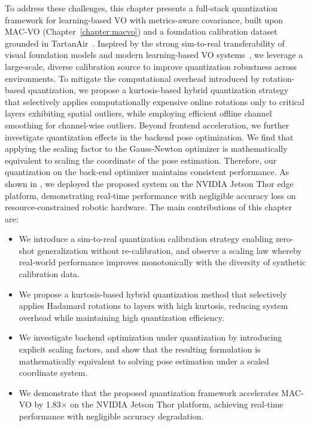 To address these challenges, this chapter presents a full-stack quantization framework for learning-based VO with metrics-aware covariance, built upon MAC-VO (Chapter~\ref{chapter:macvo}) and a foundation calibration dataset grounded in TartanAir~\cite{tartanair}. 
Inspired by the strong sim-to-real transferability of visual foundation models and modern learning-based VO systems~\cite{qiu2025mac}, we leverage a large-scale, diverse calibration source to improve quantization robustness across environments. 
To mitigate the computational overhead introduced by rotation-based quantization, we propose a kurtosis-based hybrid quantization strategy that selectively applies computationally expensive online rotations only to critical layers exhibiting spatial outliers, while employing efficient offline channel smoothing for channel-wise outliers. 
Beyond frontend acceleration, we further investigate quantization effects in the backend pose optimization.
We find that applying the scaling factor to the Gauss-Newton optimizer is mathematically equivalent to scaling the coordinate of the pose estimation.
Therefore, our quantization on the back-end optimizer maintains consistent performance.
As shown in , we deployed the proposed system on the NVIDIA Jetson Thor edge platform, demonstrating real-time performance with negligible accuracy loss on resource-constrained robotic hardware. 
The main contributions of this chapter are:

\begin{itemize} 
\item We introduce a sim-to-real quantization calibration strategy enabling zero-shot generalization without re-calibration, and observe a scaling law whereby real-world performance improves monotonically with the diversity of synthetic calibration data.

\item We propose a {kurtosis-based hybrid quantization} method that selectively applies Hadamard rotations to layers with high kurtosis, reducing system overhead while maintaining high quantization efficiency.

\item We investigate backend optimization under quantization by introducing explicit scaling factors, and show that the resulting formulation is mathematically equivalent to solving pose estimation under a scaled coordinate system.

\item We demonstrate that the proposed quantization framework accelerates MAC-VO by 1.83$\times$ on the NVIDIA Jetson Thor platform, achieving real-time performance with negligible accuracy degradation.

\end{itemize}

